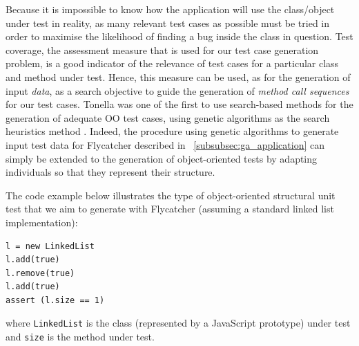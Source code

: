 \documentclass[a4paper,11pt,titlepage]{report}
\begin{document}
Because it is impossible to know how the application will use the class/object under test in reality, as many relevant test cases as possible must be tried in order to maximise the likelihood of finding a bug inside the class in question. Test coverage, the assessment measure that is used for our test case generation problem, is a good indicator of the relevance of test cases for a particular class and method under test. Hence, this measure can be used, as for the generation of input \emph{data}, as a search objective to guide the generation of \emph{method call sequences} for our test cases. Tonella was one of the first to use search-based methods for the generation of adequate OO test cases, using genetic algorithms as the search heuristics method \cite{tonella2004evolutionary}. Indeed, the procedure using genetic algorithms to generate input test data for Flycatcher described in ~\ref{subsubsec:ga_application} can simply be extended to the generation of object-oriented tests by adapting individuals so that they represent their structure.

The code example below illustrates the type of object-oriented structural unit test that we aim to generate with Flycatcher (assuming a standard linked list implementation):

\begin{verbatim}
l = new LinkedList
l.add(true)
l.remove(true)
l.add(true)
assert (l.size == 1)
\end{verbatim}

where \texttt{LinkedList} is the class (represented by a JavaScript prototype) under test and \texttt{size} is the method under test.



\end{document}
